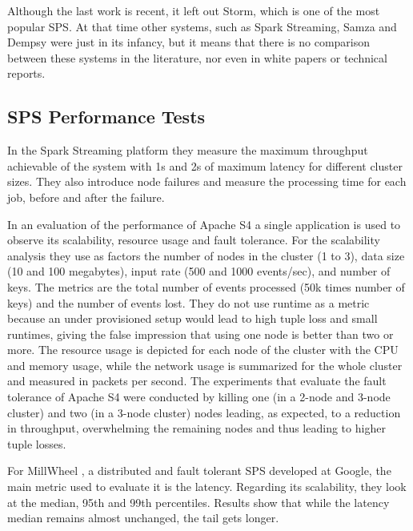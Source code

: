 \documentclass[ppgc,diss,english]{iiufrgs}
\begin{document}
Although the last work is recent, it left out Storm, which is one of the most popular SPS. At that time other systems, such as Spark Streaming, Samza and Dempsy were just in its infancy, but it means that there is no comparison between these systems in the literature, nor even in white papers or technical reports.

\subsection{SPS Performance Tests}

In the Spark Streaming platform \cite{zaharia2012discretized} they measure the maximum throughput achievable of the system with 1s and 2s of maximum latency for different cluster sizes. They also introduce node failures and measure the processing time for each job, before and after the failure.

In an evaluation of the performance of Apache S4 \cite{chauhan2012performance} a single application is used to observe its scalability, resource usage and fault tolerance. For the scalability analysis they use as factors the number of nodes in the cluster (1 to 3), data size (10 and 100 megabytes), input rate (500 and 1000 events/sec), and number of keys. The metrics are the total number of events processed (50k times number of keys) and the number of events lost. They do not use runtime as a metric because an under provisioned setup would lead to high tuple loss and small runtimes, giving the false impression that using one node is better than two or more. The resource usage is depicted for each node of the cluster with the CPU and memory usage, while the network usage is summarized for the whole cluster and measured in packets per second. The experiments that evaluate the fault tolerance of Apache S4 were conducted by killing one (in a 2-node and 3-node cluster) and two (in a 3-node cluster) nodes leading, as expected, to a reduction in throughput, overwhelming the remaining nodes and thus leading to higher tuple losses.

For MillWheel \cite{akidau2013millwheel}, a distributed and fault tolerant SPS developed at Google, the main metric used to evaluate it is the latency. Regarding its scalability, they look at the median, 95th and 99th percentiles. Results show that while the latency median remains almost unchanged, the tail gets longer.
\end{document}
